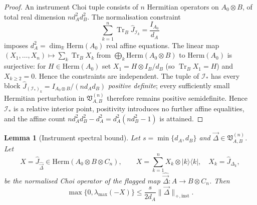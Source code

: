 \documentclass[11pt,a4paper]{article}
\newtheorem{lemma}[theorem]{Lemma}
\newcommand{\Herm}{\mathrm{Herm}}
\newcommand{\Tr}{\operatorname{Tr}}
\newcommand{\Jhat}{\widehat J}
\newcommand{\vD}{\vec{\Delta}}
\begin{document}
\begin{proof}
An instrument Choi tuple consists of $n$ Hermitian operators on $A_0\otimes B$, of total real dimension $nd_A^2d_B^2$. The normalisation constraint
\[
\sum_{k=1}^n\Tr_B\Jhat_{\mathcal I_k}=\frac{I_{A_0}}{d_A}
\]
imposes $d_A^2=\dim_{\mathbb R}\Herm(A_0)$ real affine equations. The linear map $(X_1,\dots,X_n)\mapsto\sum_k\Tr_BX_k$ from $\bigoplus_k\Herm(A_0\otimes B)$ to $\Herm(A_0)$ is surjective: for $H\in\Herm(A_0)$ set $X_1=H\otimes I_B/d_B$ (so $\Tr_BX_1=H$) and $X_{k\ge2}=0$. Hence the constraints are independent. The tuple of $\mathcal I_*$ has every block $\Jhat_{(\mathcal I_*)_k}=I_{A_0\otimes B}/(nd_Ad_B)$ \emph{positive definite}; every sufficiently small Hermitian perturbation in $\mathfrak V_{A,B}^{(n)}$ therefore remains positive semidefinite. Hence $\mathcal I_*$ is a relative interior point, positivity introduces no further affine equalities, and the affine count $nd_A^2d_B^2-d_A^2=d_A^2(nd_B^2-1)$ is attained.
\end{proof}

\begin{lemma}[Instrument spectral bound]
\label{lem:spectral}
Let $s=\min\{d_A,d_B\}$ and $\vD\in\mathfrak V_{A,B}^{(n)}$. Let
\[
X=\Jhat_{\widehat{\vD}}\in\Herm(A_0\otimes B\otimes C_n),\qquad
X=\sum_{k=1}^nX_k\otimes|k\rangle\langle k|,\quad X_k=\Jhat_{\Delta_k},
\]
be the normalised Choi operator of the flagged map $\widehat{\vD}:A\to B\otimes C_n$. Then
\[
\max\{0,\lambda_{\max}(-X)\}\le\frac{s}{2d_A}\|\vD\|_{\diamond,\mathrm{inst}}.
\]
\end{lemma}
\end{document}
